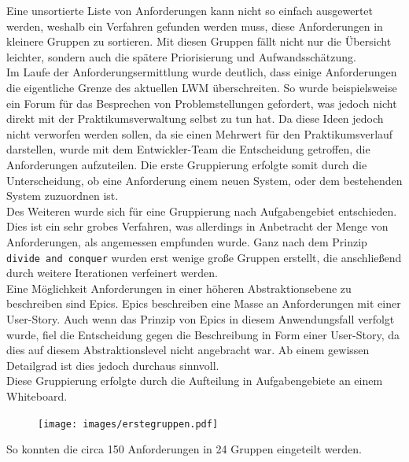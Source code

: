 Eine unsortierte Liste von Anforderungen kann nicht so einfach ausgewertet werden, weshalb ein Verfahren gefunden werden muss, diese Anforderungen in kleinere Gruppen zu sortieren. Mit diesen Gruppen fällt nicht nur die Übersicht leichter, sondern auch die spätere Priorisierung und Aufwandsschätzung.\\

Im Laufe der Anforderungsermittlung wurde deutlich, dass einige Anforderungen die eigentliche Grenze des aktuellen \ac{LWM} überschreiten. So wurde beispielsweise ein Forum für das Besprechen von Problemstellungen gefordert, was jedoch nicht direkt mit der Praktikumsverwaltung selbst zu tun hat. Da diese Ideen jedoch nicht verworfen werden sollen, da sie einen Mehrwert für den Praktikumsverlauf darstellen, wurde mit dem Entwickler-Team die Entscheidung getroffen, die Anforderungen aufzuteilen. Die erste Gruppierung erfolgte somit durch die Unterscheidung, ob eine Anforderung einem neuen System, oder dem bestehenden System zuzuordnen ist.\\

Des Weiteren wurde sich für eine Gruppierung nach Aufgabengebiet entschieden. Dies ist ein sehr grobes Verfahren, was allerdings in Anbetracht der Menge von Anforderungen, als angemessen empfunden wurde. Ganz nach dem Prinzip \texttt{divide and conquer} wurden erst wenige große Gruppen erstellt, die anschließend durch weitere Iterationen verfeinert werden. \\

Eine Möglichkeit Anforderungen in einer höheren Abstraktionsebene zu beschreiben sind Epics. Epics beschreiben eine Masse an Anforderungen mit einer User-Story. Auch wenn das Prinzip von Epics in diesem Anwendungsfall verfolgt wurde, fiel die Entscheidung gegen die Beschreibung in Form einer User-Story, da dies auf diesem Abstraktionslevel nicht angebracht war. Ab einem gewissen Detailgrad ist dies jedoch durchaus sinnvoll.\\

Diese Gruppierung erfolgte durch die Aufteilung in Aufgabengebiete an einem Whiteboard. 
\begin{figure}[!htb]
		\texttt{[image: images/erstegruppen.pdf]}
\centering 
{} 
\end{figure}

So konnten die circa 150 Anforderungen in 24 Gruppen eingeteilt werden.\\

